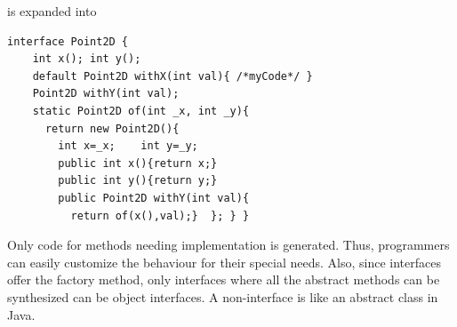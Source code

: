 \noindent is expanded into
\begin{lstlisting}
interface Point2D {
    int x(); int y();
    default Point2D withX(int val){ /*myCode*/ }
    Point2D withY(int val);
    static Point2D of(int _x, int _y){
      return new Point2D(){
        int x=_x;    int y=_y;
        public int x(){return x;}
        public int y(){return y;}
        public Point2D withY(int val){
          return of(x(),val);}  }; } }
\end{lstlisting}

\noindent Only code for methods needing implementation is generated. Thus,
programmers can easily customize the behaviour for their special needs.
Also, since \mixin interfaces offer the \Q@of@ factory method, only interfaces where all the abstract methods
can be synthesized can be object interfaces. A non-\mixin interface is like an abstract class in Java.





